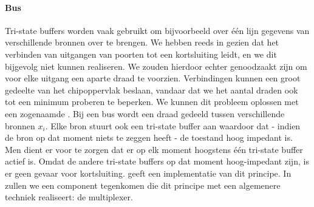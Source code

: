 \paragraph{Bus}
Tri-state buffers worden vaak gebruikt om bijvoorbeeld over \'e\'en lijn gegevens van verschillende bronnen over te brengen. We hebben reeds in  gezien dat het verbinden van uitgangen van poorten tot een kortsluiting leidt, en we dit bijgevolg niet kunnen realiseren. We zouden hierdoor echter genoodzaakt zijn om voor elke uitgang een aparte draad te voorzien. Verbindingen kunnen een groot gedeelte van het chipoppervlak beslaan, vandaar dat we het aantal draden ook tot een minimum proberen te beperken. We kunnen dit probleem oplossen met een zogenaamde . Bij een bus wordt een draad gedeeld tussen verschillende bronnen $x_i$. Elke bron stuurt ook een tri-state buffer aan waardoor dat - indien de bron op dat moment niets te zeggen heeft - de toestand hoog impedant is. Men dient er voor te zorgen dat er op elk moment hoogstens \'e\'en tri-state buffer actief is. Omdat de andere tri-state buffers op dat moment hoog-impedant zijn, is er geen gevaar voor kortsluiting.  geeft een implementatie van dit principe. In  zullen we een component tegenkomen die dit principe met een algemenere techniek realiseert: de multiplexer.
